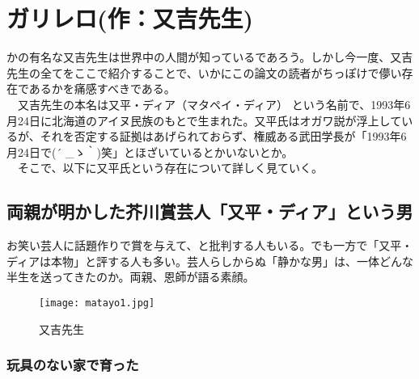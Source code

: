 \chapter{ガリレロ(作：又吉先生)}

かの有名な又吉先生は世界中の人間が知っているであろう。しかし今一度、又吉先生の全てをここで紹介することで、いかにこの論文の読者がちっぽけで儚い存在であるかを痛感すべきである。\\
　又吉先生の本名は又平・ディア（マタペイ・ディア）
という名前で、1993年6月24日に北海道のアイヌ民族のもとで生まれた。又平氏はオガワ説が浮上しているが、それを否定する証拠はあげられておらず、権威ある武田学長が「1993年6月24日で\sf(´ \_ゝ｀)笑」とほざいているとかいないとか。\\
　そこで、以下に又平氏という存在について詳しく見ていく。
\section{両親が明かした芥川賞芸人「又平・ディア」という男}
お笑い芸人に話題作りで賞を与えて、と批判する人もいる。でも一方で「又平・ディアは本物」と評する人も多い。芸人らしからぬ「静かな男」は、一体どんな半生を送ってきたのか。両親、恩師が語る素顔。
\begin{figure}[H]
\centering
\texttt{[image: matayo1.jpg]}
\caption{又吉先生}
\label{matayo1}
\end{figure}

\subsection{玩具のない家で育った}

